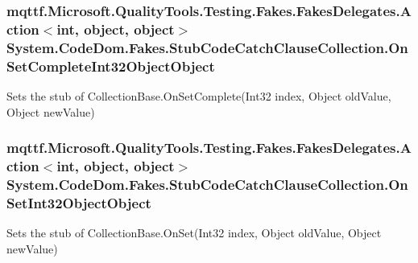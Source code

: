 \hypertarget{class_system_1_1_code_dom_1_1_fakes_1_1_stub_code_catch_clause_collection_a246120e81caab485a1e01006f47cb2f7}{
\subsubsection[{On\-Set\-Complete\-Int32\-Object\-Object}]{\setlength{\rightskip}{0pt plus 5cm}mqttf.\-Microsoft.\-Quality\-Tools.\-Testing.\-Fakes.\-Fakes\-Delegates.\-Action$<$int, object, object$>$ System.\-Code\-Dom.\-Fakes.\-Stub\-Code\-Catch\-Clause\-Collection.\-On\-Set\-Complete\-Int32\-Object\-Object}}\label{class_system_1_1_code_dom_1_1_fakes_1_1_stub_code_catch_clause_collection_a246120e81caab485a1e01006f47cb2f7}


Sets the stub of Collection\-Base.\-On\-Set\-Complete(\-Int32 index, Object old\-Value, Object new\-Value)

\hypertarget{class_system_1_1_code_dom_1_1_fakes_1_1_stub_code_catch_clause_collection_a30d057b87f7fa44579c2079a22d77808}{
\subsubsection[{On\-Set\-Int32\-Object\-Object}]{\setlength{\rightskip}{0pt plus 5cm}mqttf.\-Microsoft.\-Quality\-Tools.\-Testing.\-Fakes.\-Fakes\-Delegates.\-Action$<$int, object, object$>$ System.\-Code\-Dom.\-Fakes.\-Stub\-Code\-Catch\-Clause\-Collection.\-On\-Set\-Int32\-Object\-Object}}\label{class_system_1_1_code_dom_1_1_fakes_1_1_stub_code_catch_clause_collection_a30d057b87f7fa44579c2079a22d77808}


Sets the stub of Collection\-Base.\-On\-Set(\-Int32 index, Object old\-Value, Object new\-Value)

